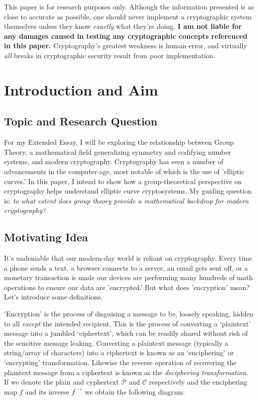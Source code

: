 \documentclass[11pt, a4paper]{report}
\newcommand{\inv}{^{\raisebox{.2em}{$\scriptscriptstyle-1$}}}
\begin{document}
This paper is for research purposes only. Although the information presented is as close to accurate as possible, one should never implement a cryptographic system themselves unless they know \textit{\emph{exactly}} what they're doing. \textbf{I am not liable for any damages caused in testing any cryptographic concepts referenced in this paper.} Cryptography's greatest weakness is human-error, and virtually \textit{all} breaks in cryptographic security result from poor implementation.\autocite{thimbleby}

\section{Introduction and Aim}
\subsection{Topic and Research Question}

For my Extended Essay, I will be exploring the relationship between Group Theory, a mathematical field generalizing symmetry and codifying number systems, and modern cryptography. Cryptography has seen a number of advancements in the computer-age, most notable of which is the use of 'elliptic curves.' In this paper, I intend to show how a group-theoretical perspective on cryptography helps understand elliptic curve cryptosystems. My guiding question is: \textit{to what extent does group theory provide a mathematical backdrop for modern cryptography?}

\subsection{Motivating Idea}
It's undeniable that our modern-day world is reliant on cryptography. Every time a phone sends a text, a browser connects to a server, an email gets sent off, or a monetary transaction is made our devices are performing many hundreds of math operations to ensure our data are 'encrypted.' But what does 'encryption' mean? Let's introduce some definitions. 

‘Encryption’ is the process of disguising a message to be, loosely speaking, hidden to all \textit{except} the intended recipient. This is the process of converting a ‘plaintext’ message into a jumbled ‘ciphertext’, which can be readily shared without risk of the sensitive message leaking. Converting a plaintext message (typically a string/array of characters) into a ciphertext is known as an ‘enciphering’ or ‘encrypting’ transformation. Likewise the reverse operation of recovering the plaintext message from a ciphertext is known as the \textit{deciphering transformation.}\autocite[54]{koblitz} If we denote the plain and cyphertext $\mathcal{P}$ and $\mathcal{C}$ respectively and the enciphering map $f$ and its inverse $f\inv$ we obtain the following diagram:
\end{document}
